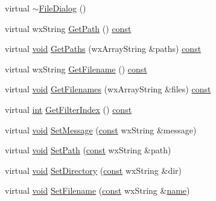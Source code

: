 \begin{DoxyCompactItemize}
\item 
virtual \hyperlink{class_file_dialog_a43b18e7f6756c0c57fde047f9ef5f34e}{$\sim$\+File\+Dialog} ()
\item 
virtual wx\+String \hyperlink{class_file_dialog_a0646c54c01bbffe2364c5ea81927d286}{Get\+Path} () \hyperlink{getopt1_8c_a2c212835823e3c54a8ab6d95c652660e}{const} 
\item 
virtual \hyperlink{sound_8c_ae35f5844602719cf66324f4de2a658b3}{void} \hyperlink{class_file_dialog_ad1892eab8140bb1e254b3dc1aa027db4}{Get\+Paths} (wx\+Array\+String \&paths) \hyperlink{getopt1_8c_a2c212835823e3c54a8ab6d95c652660e}{const} 
\item 
virtual wx\+String \hyperlink{class_file_dialog_a70571e479220a49c4c088cdcf4920f7a}{Get\+Filename} () \hyperlink{getopt1_8c_a2c212835823e3c54a8ab6d95c652660e}{const} 
\item 
virtual \hyperlink{sound_8c_ae35f5844602719cf66324f4de2a658b3}{void} \hyperlink{class_file_dialog_a08af5d3be717ca294100d0ae03e11f78}{Get\+Filenames} (wx\+Array\+String \&files) \hyperlink{getopt1_8c_a2c212835823e3c54a8ab6d95c652660e}{const} 
\item 
virtual \hyperlink{xmltok_8h_a5a0d4a5641ce434f1d23533f2b2e6653}{int} \hyperlink{class_file_dialog_ab6f82cc8bb39eca960b525fb50249e43}{Get\+Filter\+Index} () \hyperlink{getopt1_8c_a2c212835823e3c54a8ab6d95c652660e}{const} 
\item 
virtual \hyperlink{sound_8c_ae35f5844602719cf66324f4de2a658b3}{void} \hyperlink{class_file_dialog_a8e1b8b1e213b49967ed83701359e6e6c}{Set\+Message} (\hyperlink{getopt1_8c_a2c212835823e3c54a8ab6d95c652660e}{const} wx\+String \&message)
\item 
virtual \hyperlink{sound_8c_ae35f5844602719cf66324f4de2a658b3}{void} \hyperlink{class_file_dialog_a51892ed1caa1503f6c96c1d30674c7e4}{Set\+Path} (\hyperlink{getopt1_8c_a2c212835823e3c54a8ab6d95c652660e}{const} wx\+String \&path)
\item 
virtual \hyperlink{sound_8c_ae35f5844602719cf66324f4de2a658b3}{void} \hyperlink{class_file_dialog_a0dc4a113cfd796c9e81036c7ba60387a}{Set\+Directory} (\hyperlink{getopt1_8c_a2c212835823e3c54a8ab6d95c652660e}{const} wx\+String \&dir)
\item 
virtual \hyperlink{sound_8c_ae35f5844602719cf66324f4de2a658b3}{void} \hyperlink{class_file_dialog_a9d20d9529d937f2e0cc6f9ae3b1557e3}{Set\+Filename} (\hyperlink{getopt1_8c_a2c212835823e3c54a8ab6d95c652660e}{const} wx\+String \&\hyperlink{lib_2expat_8h_a1b49b495b59f9e73205b69ad1a2965b0}{name})
\item 

\end{DoxyCompactItemize}
